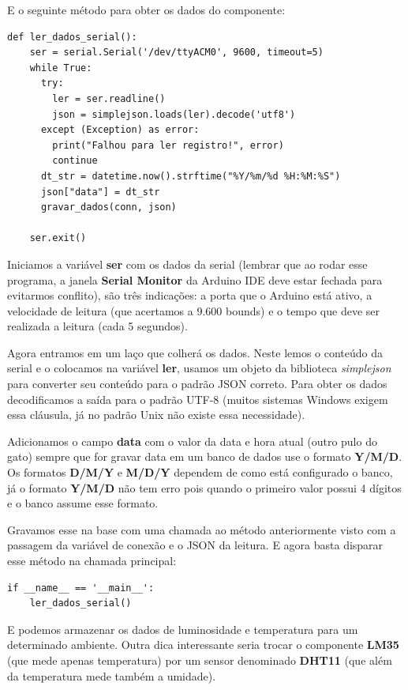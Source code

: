 \documentclass[a4paper,11pt]{article}
\begin{document}
E o seguinte método para obter os dados do componente:
\begin{lstlisting}[]
  def ler_dados_serial():
    ser = serial.Serial('/dev/ttyACM0', 9600, timeout=5)
    while True:
      try:
        ler = ser.readline()
        json = simplejson.loads(ler).decode('utf8')
      except (Exception) as error:
        print("Falhou para ler registro!", error)
        continue
      dt_str = datetime.now().strftime("%Y/%m/%d %H:%M:%S")
      json["data"] = dt_str
      gravar_dados(conn, json)

    ser.exit()
\end{lstlisting}

Iniciamos a variável \textbf{ser} com os dados da serial (lembrar que ao rodar esse programa, a janela \textbf{Serial Monitor} da Arduino IDE deve estar fechada para evitarmos conflito), são três indicações: a porta que o Arduino está ativo, a velocidade de leitura (que acertamos a 9.600 bounds) e o tempo que deve ser realizada a leitura (cada 5 segundos). 

Agora entramos em um laço que colherá os dados. Neste lemos o conteúdo da serial e o colocamos na variável \textbf{ler}, usamos um objeto da biblioteca \textit{simplejson} para converter seu conteúdo para o padrão JSON correto. Para obter os dados decodificamos a saída para o padrão UTF-8 (muitos sistemas Windows exigem essa cláusula, já no padrão Unix não existe essa necessidade). 

Adicionamos o campo \textbf{data} com o valor da data e hora atual (outro pulo do gato) sempre que for gravar data em um banco de dados use o formato \textbf{Y/M/D}. Os formatos \textbf{D/M/Y} e \textbf{M/D/Y} dependem de como está configurado o banco, já o formato \textbf{Y/M/D} não tem erro pois quando o primeiro valor possui 4 dígitos e o banco assume esse formato. 

Gravamos esse na base com uma chamada ao método anteriormente visto com a passagem da variável de conexão e o JSON da leitura. E agora basta disparar esse método na chamada principal:
\begin{lstlisting}[]
  if __name__ == '__main__':
    ler_dados_serial()
\end{lstlisting}

E podemos armazenar os dados de luminosidade e temperatura para um determinado ambiente. Outra dica interessante seria trocar o componente \textbf{LM35} (que mede apenas temperatura) por um sensor denominado \textbf{DHT11} (que além da temperatura mede também a umidade).
\end{document}
